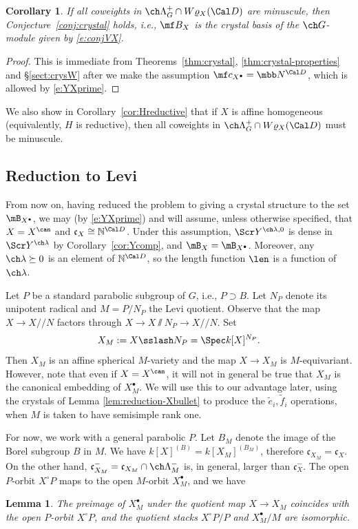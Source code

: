 \documentclass[final]{amsart}
\newtheorem{lem}[subsubsection]{Lemma}
\newtheorem{cor}[subsubsection]{Corollary}
\theoremstyle{remark}
\theoremstyle{definition}
\numberwithin{equation}{section}
\begin{document}
\begin{cor} \label{cor:minuscule}
If all coweights in $\ch\Lambda^+_G \cap W\varrho_X(\Cal D)$ are 
minuscule, then Conjecture~\ref{conj:crystal} holds, i.e., $\mf B_{X}$ is the crystal basis of 
the $\ch G$-module given by \eqref{e:conjVX}. 
\end{cor}
\begin{proof}
This is immediate from Theorems~\ref{thm:crystal}, \ref{thm:crystal-properties} and 
\S\ref{sect:crysW} after we make the assumption $\mf c_{X^\bullet} = \mbb N^{\Cal D}$, which is
allowed by \eqref{e:YXprime}.  
\end{proof}

We also show in Corollary~\ref{cor:Hreductive} that if $X$ is affine homogeneous (equivalently, $H$ is reductive), then 
all coweights in $\ch\Lambda^+_G\cap W\varrho_X(\Cal D)$ must be minuscule. 

\subsection{Reduction to Levi}
\label{sect:crystal-reduction}

From now on, having reduced the problem to giving a crystal structure to the set $\mB_{X^\bullet}$, we may (by \eqref{e:YXprime}) and will assume, unless
otherwise specified, that $X = X^\can$ and $\mathfrak c_X \cong 
\mathbb N^{\Cal D}$. 
Under this assumption, $\Scr Y^{\ch\lambda,0}$ is dense in $\Scr Y^{\ch\lambda}$ by 
Corollary~\ref{cor:Ycomp}, and $\mB_X = \mB_{X^\bullet}$. Moreover, any $\ch\lambda\succeq 0$ is an element of $\mathbb N^{\Cal D}$, so the length function $\len$ is a function of $\ch\lambda$.

\medskip


Let $P$ be a standard parabolic subgroup of $G$, i.e., $P \supset B$. 
Let $N_P$ denote its unipotent radical and $M=P/N_P$ the Levi quotient. 
Observe that the map $X \to X/\!\!/N$ factors through 
$X \to X \sslash N_P \to X/\!\!/N$. 
Set 
\[ X_M := X \sslash N_P = \Spec k[X]^{N_P}. \]
Then $X_M$ is an affine spherical $M$-variety
and the map $X \to X_M$ is $M$-equivariant. 
However, note that even if $X = X^\can$, it will not in general 
be true that $X_M$ is the canonical embedding of $X_M^\bullet$. We will use this
to our advantage later, using the crystals of Lemma \ref{lem:reduction-Xbullet} to produce the $\tilde e_i,\tilde f_i$ operations, when $M$ is taken to have semisimple rank one.

For now, we work with a general parabolic $P$. Let $B_M$ denote the image of the Borel subgroup $B$ in $M$.
We have $k[X]^{(B)} = k[X_M]^{(B_M)}$, therefore $\mathfrak c_{X_M} = \mathfrak c_X$. On the other hand, $\mathfrak c_{X_M}^- =\mathfrak c_{X_M} \cap \ch\Lambda_M^-$ is, in general, larger than $\mathfrak c_X^-$. The open $P$-orbit $X^\circ P$ maps to the open $M$-orbit $X_M^\bullet$, and we have
\begin{lem}
 \label{lem:openPorbit}
The preimage of $X_M^\bullet$ under the quotient map $X\to X_M$ coincides with the open $P$-orbit $X^\circ P$, and the quotient stacks $X^\circ P/P$ and $X_M^\bullet/M$ are isomorphic.
\end{lem}
\end{document}
